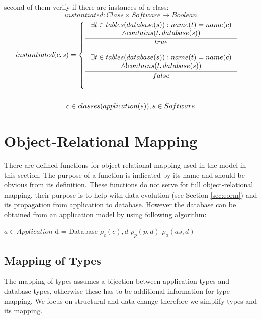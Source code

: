 \documentclass[11pt]{article}
\begin{document}
second of them verify if there are instances of a class:
$$instantiated : Class \times Software \rightarrow Boolean $$ 
\begin{equation*}
\begin{gathered}
	instantiated(c, s) = \begin{cases}
 \inference{\exists t \in tables(database(s)) : name(t) = name(c) \\ \wedge contains(t, database(s))}{true} \\ \\
  \inference{\exists t \in tables(database(s)) : name(t) = name(c) \\ \wedge ! contains(t, database(s))}{false} \\ \\
 \end{cases} \\ \\
 c \in classes(application(s)), s \in Software 
\end{gathered}
\end{equation*}


\section{Object-Relational Mapping}
\label{sec:orm}
There are defined functions for object-relational mapping used in the model in this section. The purpose of a function is indicated by its name and should be obvious from its definition. These functions do not serve for full object-relational mapping, their purpose is to help with data evolution (see Section \ref{sec:eorm}) and its propagation from application to database. However the database can be obtained from an application model by using following algorithm:

\begin{algorithmic}[1]
	\Require $a \in Application$
	\State d = Database
		\State $\rho_c(c), d$
			\State $\rho_p(p, d)$
		\EndFor
	 \EndFor
			\State $\rho_{a}(as, d)$
		\EndFor
	\EndFor
\end{algorithmic}


\subsection{Mapping of Types}
The mapping of types assumes a bijection between application types and database types, otherwise these has to be additional information for type mapping. We focus on structural and data change therefore we simplify types and its mapping.
\end{document}
